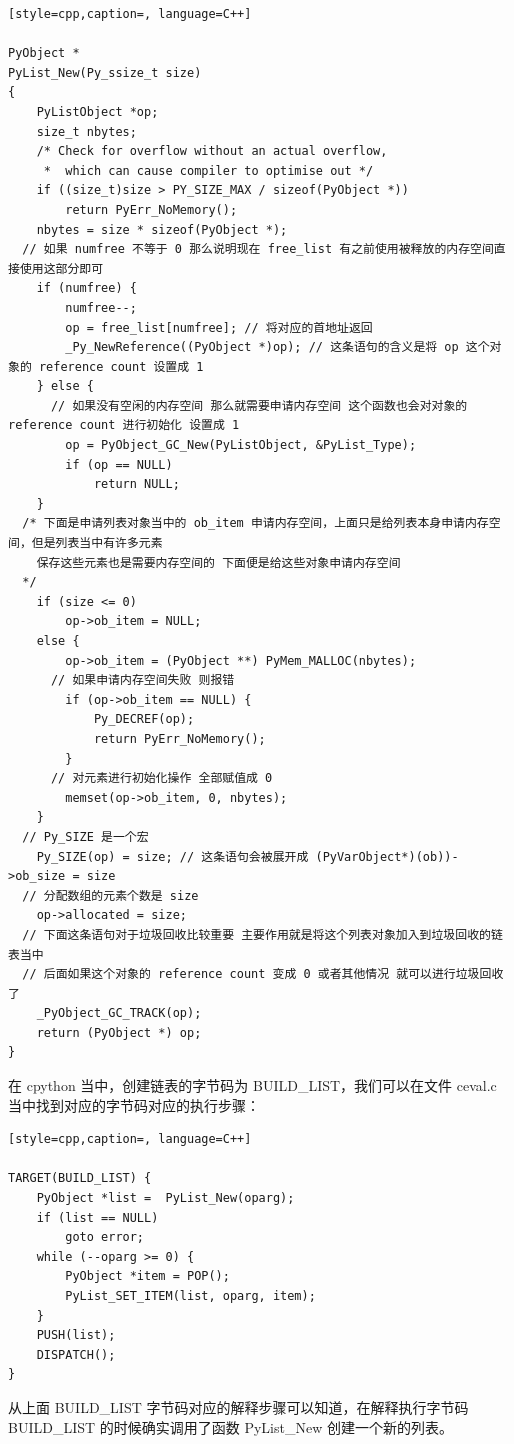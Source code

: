 \begin{lstlisting}[style=cpp,caption=, language=C++]

PyObject *
PyList_New(Py_ssize_t size)
{
    PyListObject *op;
    size_t nbytes;
    /* Check for overflow without an actual overflow,
     *  which can cause compiler to optimise out */
    if ((size_t)size > PY_SIZE_MAX / sizeof(PyObject *))
        return PyErr_NoMemory();
    nbytes = size * sizeof(PyObject *);
  // 如果 numfree 不等于 0 那么说明现在 free_list 有之前使用被释放的内存空间直接使用这部分即可
    if (numfree) {
        numfree--;
        op = free_list[numfree]; // 将对应的首地址返回
        _Py_NewReference((PyObject *)op); // 这条语句的含义是将 op 这个对象的 reference count 设置成 1
    } else {
      // 如果没有空闲的内存空间 那么就需要申请内存空间 这个函数也会对对象的 reference count 进行初始化 设置成 1
        op = PyObject_GC_New(PyListObject, &PyList_Type);
        if (op == NULL)
            return NULL;
    }
  /* 下面是申请列表对象当中的 ob_item 申请内存空间，上面只是给列表本身申请内存空间，但是列表当中有许多元素
  	保存这些元素也是需要内存空间的 下面便是给这些对象申请内存空间
  */
    if (size <= 0)
        op->ob_item = NULL;
    else {
        op->ob_item = (PyObject **) PyMem_MALLOC(nbytes);
      // 如果申请内存空间失败 则报错
        if (op->ob_item == NULL) {
            Py_DECREF(op);
            return PyErr_NoMemory();
        }
      // 对元素进行初始化操作 全部赋值成 0
        memset(op->ob_item, 0, nbytes);
    }
  // Py_SIZE 是一个宏
    Py_SIZE(op) = size; // 这条语句会被展开成 (PyVarObject*)(ob))->ob_size = size
  // 分配数组的元素个数是 size
    op->allocated = size;
  // 下面这条语句对于垃圾回收比较重要 主要作用就是将这个列表对象加入到垃圾回收的链表当中
  // 后面如果这个对象的 reference count 变成 0 或者其他情况 就可以进行垃圾回收了
    _PyObject_GC_TRACK(op);
    return (PyObject *) op;
}
\end{lstlisting}
在 cpython 当中，创建链表的字节码为 BUILD\_LIST，我们可以在文件 ceval.c 当中找到对应的字节码对应的执行步骤：
\begin{lstlisting}[style=cpp,caption=, language=C++]

TARGET(BUILD_LIST) {
    PyObject *list =  PyList_New(oparg);
    if (list == NULL)
        goto error;
    while (--oparg >= 0) {
        PyObject *item = POP();
        PyList_SET_ITEM(list, oparg, item);
    }
    PUSH(list);
    DISPATCH();
}
\end{lstlisting}
从上面 BUILD\_LIST 字节码对应的解释步骤可以知道，在解释执行字节码 BUILD\_LIST 的时候确实调用了函数 PyList\_New 创建一个新的列表。
